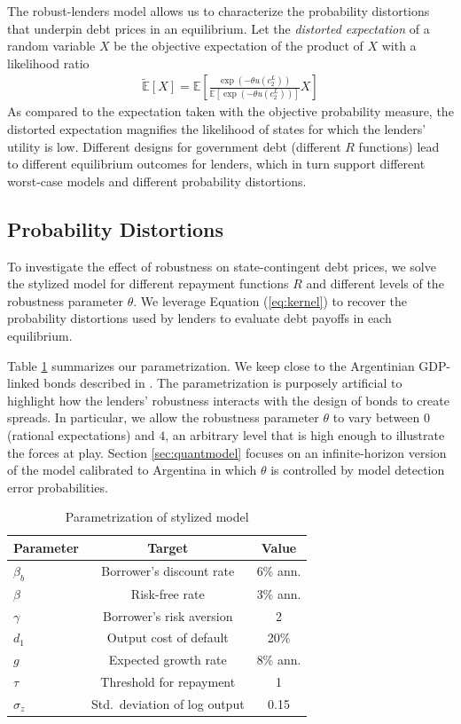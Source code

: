The robust-lenders model allows us to characterize the probability distortions that underpin debt prices in an equilibrium. Let the \emph{distorted expectation} of a random variable $X$ be the objective expectation of the product of $X$ with a likelihood ratio
\begin{align}\label{eq:kernel}
  \tilde{\mathbb{E}}\left[X\right] = \mathbb{E}\left[\frac{\exp(-\theta u(c_2^L))}{\mathbb{E}\left[\exp(-\theta u(c_2^L))\right]} X \right]
\end{align}
As compared to the expectation taken with the objective probability measure, the distorted expectation magnifies the likelihood of states for which the lenders' utility is low. Different designs for government debt (different $R$ functions) lead to different equilibrium outcomes for lenders, which in turn support different worst-case models and different probability distortions.

\subsection{Probability Distortions}
To investigate the effect of robustness on state-contingent debt prices, we solve the stylized model for different repayment functions $R$ and different levels of the robustness parameter $\theta$. We leverage Equation (\ref{eq:kernel}) to recover the probability distortions used by lenders to evaluate debt payoffs in each equilibrium.

Table \ref{Table_2per_parameters} summarizes our parametrization. We keep close to the Argentinian GDP-linked bonds described in \citet*{ChamonCostaRicci2008}. The parametrization is purposely artificial to highlight how the lenders' robustness interacts with the design of bonds to create spreads. 
In particular, we allow the robustness parameter $\theta$ to vary between $0$ (rational expectations) and $4$, an arbitrary level that is high enough to illustrate the forces at play. Section \ref{sec:quantmodel} focuses on an infinite-horizon version of the model calibrated to Argentina in which $\theta$ is controlled by model detection error probabilities.
\begin{table}[!hbtp]\centering \small
  \caption{Parametrization of stylized model}\label{Table_2per_parameters}
  \begin{tabular}{@{}lcc@{}} \toprule
    \textbf{Parameter} & \textbf{Target} & \textbf{Value} \\ \midrule
    $\beta_b$       & Borrower's discount rate & 6\% ann. \\
    $\beta$         & Risk-free rate & 3\% ann.        \\
    $\gamma$        & Borrower's risk aversion & 2     \\
    $d_1$        & Output cost of default & 20\%    \\
    $g$             & Expected growth rate& 8\% ann.   \\ 
    $\tau$          & Threshold for repayment & 1   \\
    $\sigma_z$      & Std.~deviation of log output & 0.15 \\
    \bottomrule
  \end{tabular}
\end{table}

